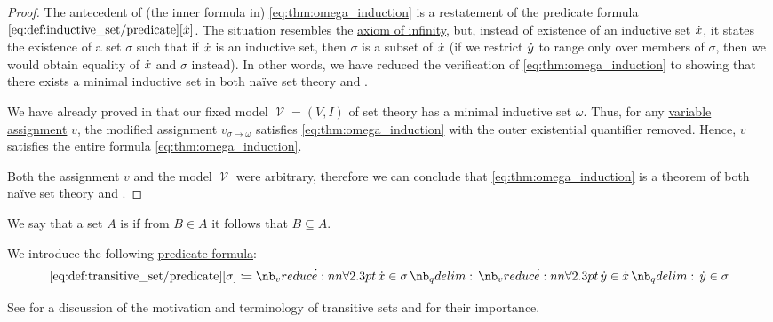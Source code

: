 \begin{proof}
  The antecedent of (the inner formula in) \eqref{eq:thm:omega_induction} is a restatement of the predicate formula \( \ref{eq:def:inductive_set/predicate}[{\dot{x}}] \). The situation resembles the \hyperref[eq:def:zfc/infinity]{axiom of infinity}, but, instead of existence of an inductive set \( {\dot{x}} \), it states the existence of a set \( \sigma \) such that if \( {\dot{x}} \) is an inductive set, then \( \sigma \) is a subset of \( {\dot{x}} \) (if we restrict \( {\dot{y}} \) to range only over members of \( \sigma \), then we would obtain equality of \( {\dot{x}} \) and \( \sigma \) instead). In other words, we have reduced the verification of \eqref{eq:thm:omega_induction} to showing that there exists a minimal inductive set in both na\"ive set theory and .

  We have already proved in  that our fixed model \( \mscrV = (V, I) \) of set theory has a minimal inductive set \( \omega \). Thus, for any \hyperref[def:first_order_valuation/variable_assignment]{variable assignment} \( v \), the modified assignment \( v_{\sigma \mapsto \omega} \) satisfies \eqref{eq:thm:omega_induction} with the outer existential quantifier removed. Hence, \( v \) satisfies the entire formula \eqref{eq:thm:omega_induction}.

  Both the assignment \( v \) and the model \( \mscrV \) were arbitrary, therefore we can conclude that \eqref{eq:thm:omega_induction} is a theorem of both na\"ive set theory and .
\end{proof}

\begin{definition}\label{def:transitive_set}
  We say that a set \( A \) is  if from \( B \in A \) it follows that \( B \subseteq A \).

  We introduce the following \hyperref[con:predicate_formula]{predicate formula}:
  \begin{equation*}\taglabel[\op{IsSetTransitive}]{eq:def:transitive_set/predicate}
    \ref{eq:def:transitive_set/predicate}[\sigma] \coloneqq \qforall {\synx \in \sigma} \qforall {\syny \in \synx} {\syny \in \sigma}
  \end{equation*}
\end{definition}
\begin{comments}
  \item See  for a discussion of the motivation and terminology of transitive sets and  for their importance.
\end{comments}

